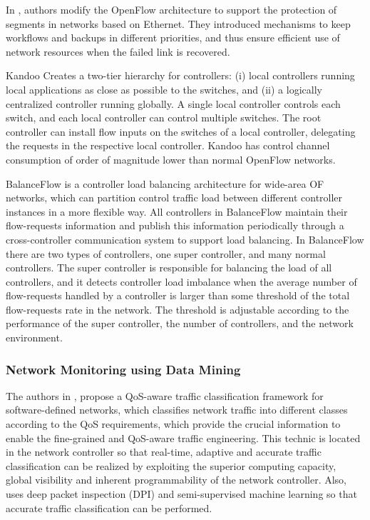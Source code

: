 In \cite{sgambelluri_2013:of_bsp}, authors modify the OpenFlow architecture to support the protection of segments in networks based on Ethernet. They introduced mechanisms to keep workflows and backups in different priorities, and thus ensure efficient use of network resources when the failed link is recovered.

Kandoo \cite{hassasYeganeh_2012:kandoo} Creates a two-tier hierarchy for controllers: (i) local controllers running local applications as close as possible to the switches, and (ii) a logically centralized controller running globally. A single local controller controls each switch, and each local controller can control multiple switches. The root controller can install flow inputs on the switches of a local controller, delegating the requests in the respective local controller. Kandoo has control channel consumption of order of magnitude lower than normal OpenFlow networks.

BalanceFlow \cite{y_hu_2012:balance_flow} is a controller load balancing architecture for wide-area OF networks, which can partition control traffic load between different controller instances in a more flexible way. All controllers in BalanceFlow maintain their flow-requests information and publish this information periodically through a cross-controller communication system to support load balancing. In BalanceFlow there are two types of controllers, one super controller, and many normal controllers. The super controller is responsible for balancing the load of all controllers, and it detects controller load imbalance when the average number of flow-requests handled by a controller is larger than some threshold of the total flow-requests rate in the network. The threshold is adjustable according to the performance of the super controller, the number of controllers, and the network environment.

\subsubsection{Network Monitoring using Data Mining}
\label{subsub:related_work-te_using_dm}

The authors in \cite{p_wang_2016:traffic_clasification}, propose a QoS-aware traffic classification framework for software-defined networks, which classifies network traffic into different classes according to the QoS requirements, which provide the crucial information to enable the fine-grained and QoS-aware traffic engineering. This technic is located in the network controller so that real-time, adaptive and accurate traffic classification can be realized by exploiting the superior computing capacity, global visibility and inherent programmability of the network controller. Also, uses deep packet inspection (DPI) and semi-supervised machine learning so that accurate traffic classification can be performed.

